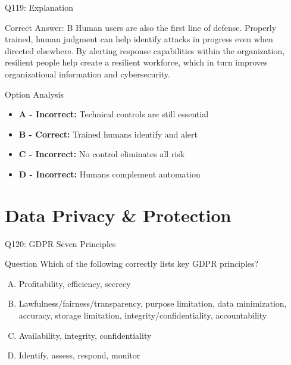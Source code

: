 \documentclass{beamer}
\begin{document}
	\begin{frame}{Q119: Explanation}
		\begin{block}{Correct Answer: B}
			Human users are also the first line of defense. Properly trained, human judgment can help identify attacks in progress even when directed elsewhere. By alerting response capabilities within the organization, resilient people help create a resilient workforce, which in turn improves organizational information and cybersecurity.
		\end{block}
		\begin{block}{Option Analysis}
			\begin{itemize}
				\item \textbf{A - Incorrect:} Technical controls are still essential
				\item \textbf{B - Correct:} Trained humans identify and alert
				\item \textbf{C - Incorrect:} No control eliminates all risk
				\item \textbf{D - Incorrect:} Humans complement automation
			\end{itemize}
		\end{block}
	\end{frame}
	
	
	\section{Data Privacy \& Protection}
	
	\begin{frame}{Q120: GDPR Seven Principles}
		\begin{block}{Question}
			Which of the following correctly lists key GDPR principles?
		\end{block}
		\begin{enumerate}[(A)]
			\item Profitability, efficiency, secrecy
			\item Lawfulness/fairness/transparency, purpose limitation, data minimization, accuracy, storage limitation, integrity/confidentiality, accountability
			\item Availability, integrity, confidentiality
			\item Identify, assess, respond, monitor
		\end{enumerate}
	\end{frame}
	
\end{document}
